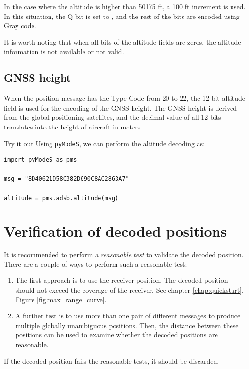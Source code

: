 In the case where the altitude is higher than 50175 ft, a 100 ft increment is used. In this situation, the Q bit is set to \0, and the rest of the bits are encoded using Gray code.

It is worth noting that when all bits of the altitude fields are zeros, the altitude information is not available or not valid.


\subsection{GNSS height}

When the position message has the Type Code from 20 to 22, the 12-bit altitude field is used for the encoding of the GNSS height. The GNSS height is derived from the global positioning satellites, and the decimal value of all 12 bits translates into the height of aircraft in meters.

\begin{notebox}{Try it out}
Using \texttt{pyModeS}, we can perform the altitude decoding as: 

\begin{verbatim}
import pyModeS as pms

msg = "8D40621D58C382D690C8AC2863A7"

altitude = pms.adsb.altitude(msg)
\end{verbatim}

\end{notebox}



\section{Verification of decoded positions}

It is recommended to perform a \emph{reasonable test} to validate the decoded position. There are a couple of ways to perform such a reasonable test:

\begin{enumerate}
  \item The first approach is to use the receiver position. The decoded position should not exceed the coverage of the receiver. See chapter \ref{chap:quickstart}, Figure \ref{fig:max_range_curve}.

  \item A further test is to use more than one pair of different messages to produce multiple globally unambiguous positions. Then, the distance between these positions can be used to examine whether the decoded positions are reasonable.
\end{enumerate}

If the decoded position fails the reasonable tests, it should be discarded.
